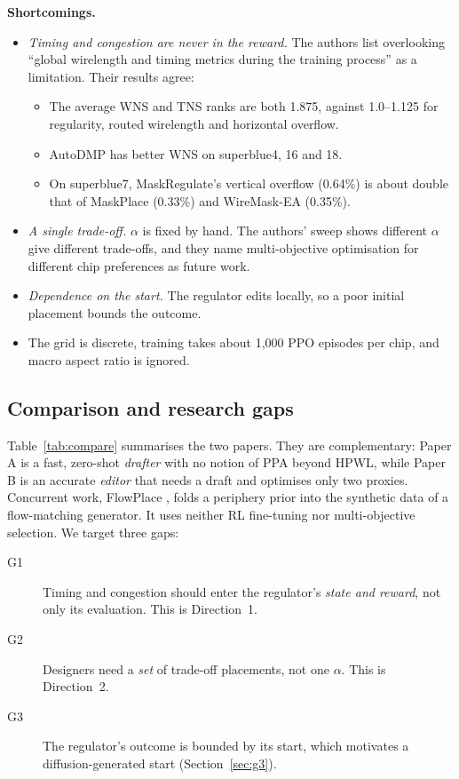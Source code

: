 \documentclass{article}
\begin{document}
\textbf{Shortcomings.}
\begin{itemize}
  \item \emph{Timing and congestion are never in the reward.} The authors list overlooking ``global
  wirelength and timing metrics during the training process'' as a limitation. Their results agree:
  \begin{itemize}
    \item The average WNS and TNS ranks are both 1.875, against 1.0--1.125 for regularity, routed
    wirelength and horizontal overflow.
    \item AutoDMP has better WNS on superblue4, 16 and 18.
    \item On superblue7, MaskRegulate's vertical overflow (0.64\%) is about double that of MaskPlace
    (0.33\%) and WireMask-EA (0.35\%).
  \end{itemize}
  \item \emph{A single trade-off.} $\alpha$ is fixed by hand. The authors' sweep shows different
  $\alpha$ give different trade-offs, and they name multi-objective optimisation for different chip
  preferences as future work.
  \item \emph{Dependence on the start.} The regulator edits locally, so a poor initial placement bounds
  the outcome.
  \item The grid is discrete, training takes about 1{,}000 PPO episodes per chip, and macro aspect
  ratio is ignored.
\end{itemize}

\subsection{Comparison and research gaps}
Table~\ref{tab:compare} summarises the two papers. They are complementary: Paper A is a fast,
zero-shot \emph{drafter} with no notion of PPA beyond HPWL, while Paper B is an accurate
\emph{editor} that needs a draft and optimises only two proxies. Concurrent work, FlowPlace
\citep{xie2026flowplace}, folds a periphery prior into the synthetic data of a flow-matching
generator. It uses neither RL fine-tuning nor multi-objective selection. We target three gaps:
\begin{description}
  \item[G1] Timing and congestion should enter the regulator's \emph{state and reward}, not only its
  evaluation. This is Direction~1.
  \item[G2] Designers need a \emph{set} of trade-off placements, not one $\alpha$. This is Direction~2.
  \item[G3] The regulator's outcome is bounded by its start, which motivates a diffusion-generated
  start (Section~\ref{sec:g3}).
\end{description}
\end{document}
